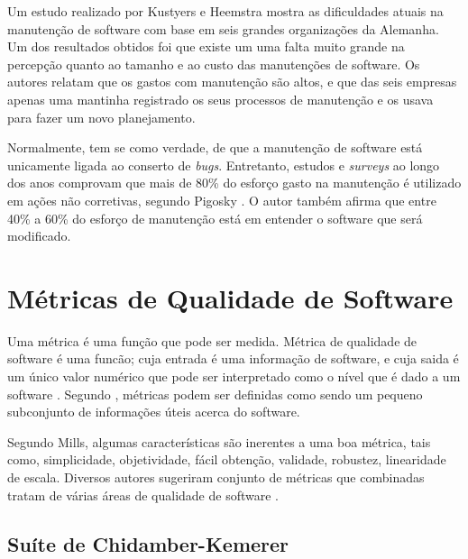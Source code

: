 Um estudo realizado por Kustyers e Heemstra \cite{kusters} mostra as dificuldades atuais na manutenção de software com base em seis grandes organizações da Alemanha. Um dos resultados obtidos foi que existe um uma falta muito grande na percepção quanto ao tamanho e ao custo das manutenções de software. Os autores relatam que os gastos com manutenção são altos, e que das seis empresas apenas uma mantinha registrado os seus processos de manutenção e os usava para fazer um novo planejamento. 

Normalmente, tem se como verdade, de que a manutenção de software está unicamente ligada ao conserto de \textit{bugs}. Entretanto, estudos e \textit{surveys} ao longo dos anos comprovam que mais de 80\% do esforço gasto na manutenção é utilizado em ações não corretivas, segundo Pigosky \cite{pigosky}. O autor também afirma que entre 40\% a 60\% do esforço de manutenção está em entender o software que será modificado.

\section{Métricas de Qualidade de Software}

Uma métrica é uma função que pode ser medida. Métrica de qualidade de software é uma funcão; cuja entrada é uma informação de software, e cuja saida é um único valor numérico que pode ser interpretado como o nível que é dado a um software \cite{karner}. Segundo \cite{pressman}, métricas podem ser definidas como sendo um pequeno subconjunto de informações úteis acerca do software.

Segundo Mills, algumas características são inerentes a uma boa métrica, tais como, simplicidade, objetividade, fácil obtenção, validade, robustez, linearidade de escala. Diversos autores sugeriram conjunto de métricas que combinadas tratam de várias áreas de qualidade de software \cite{paulo_meirelles}.

\subsection{Suíte de Chidamber-Kemerer}

